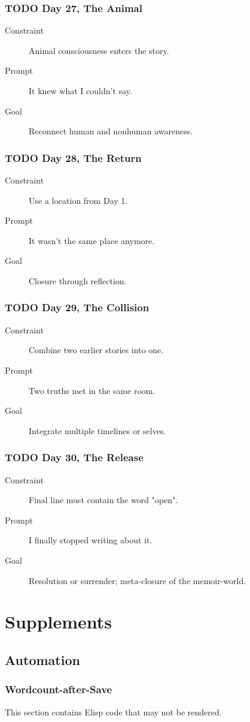 \documentclass[11pt]{article}
\begin{document}
\subsubsection*{{\bfseries\sffamily TODO} Day 27, The Animal}
\label{sec:orgf206c8d}
\begin{description}
\item[{Constraint}] Animal consciousness enters the story.
\item[{Prompt}] It knew what I couldn’t say.
\item[{Goal}] Reconnect human and nonhuman awareness.
\end{description}
\subsubsection*{{\bfseries\sffamily TODO} Day 28, The Return}
\label{sec:org83890d0}
\begin{description}
\item[{Constraint}] Use a location from Day 1.
\item[{Prompt}] It wasn’t the same place anymore.
\item[{Goal}] Closure through reflection.
\end{description}
\subsubsection*{{\bfseries\sffamily TODO} Day 29, The Collision}
\label{sec:orgaabc6c2}
\begin{description}
\item[{Constraint}] Combine two earlier stories into one.
\item[{Prompt}] Two truths met in the same room.
\item[{Goal}] Integrate multiple timelines or selves.
\end{description}
\subsubsection*{{\bfseries\sffamily TODO} Day 30, The Release}
\label{sec:orgff6b1fa}
\begin{description}
\item[{Constraint}] Final line must contain the word "open".
\item[{Prompt}] I finally stopped writing about it.
\item[{Goal}] Resolution or surrender; meta-closure of the memoir-world.
\end{description}
\stopcontents[level-1]
\section*{Supplements}
\label{sec:org121e84f}
\subsection*{Automation}
\label{sec:org2348e1d}
\subsubsection*{Wordcount-after-Save}
\label{sec:org9fd6f33}

This section contains Elisp code that may not be rendered.
\end{document}
